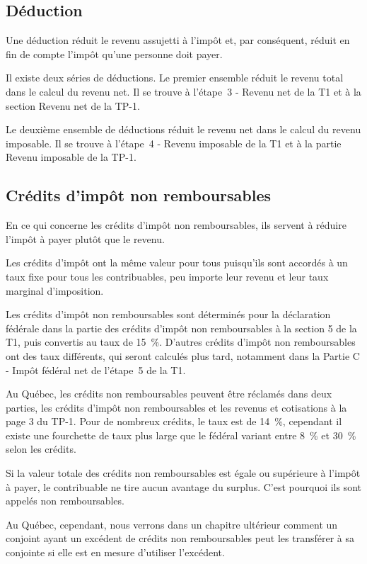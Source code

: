 \subsection{Déduction}
Une déduction réduit le revenu assujetti à l'impôt et, par conséquent, réduit en fin de compte l'impôt qu'une personne doit payer.

Il existe deux séries de déductions. Le premier ensemble réduit le revenu total dans le calcul du revenu net. Il se trouve à l'étape~3 - Revenu net de la T1 et à la section \og Revenu net \fg{} de la TP-1. 

Le deuxième ensemble de déductions réduit le revenu net dans le calcul du revenu imposable. Il se trouve à l'étape~4 - Revenu imposable de la T1 et à la partie \og Revenu imposable \fg{} de la TP-1.


\subsection{Crédits d'impôt non remboursables}
En ce qui concerne les crédits d'impôt non remboursables, ils servent à réduire l'impôt à payer plutôt que le revenu. 

Les crédits d'impôt ont la même valeur pour tous puisqu'ils sont accordés à un taux fixe pour tous les contribuables, peu importe leur revenu et leur taux marginal d'imposition. 

Les crédits d'impôt non remboursables sont déterminés pour la déclaration fédérale dans la partie des crédits d'impôt non remboursables à la section 5 de la T1, puis convertis au taux de 15~\%. D'autres crédits d'impôt non remboursables ont des taux différents, qui seront calculés plus tard, notamment dans la Partie C - Impôt fédéral net de l'étape~5 de la T1.

Au Québec, les crédits non remboursables peuvent être réclamés dans deux parties, les crédits d'impôt non remboursables et les revenus et cotisations à la page 3 du TP-1. Pour de nombreux crédits, le taux est de 14~\%, cependant il existe une fourchette de taux plus large que le fédéral variant entre 8~\% et
30~\% selon les crédits.

Si la valeur totale des crédits non remboursables est égale ou supérieure à l'impôt à payer, le contribuable ne tire aucun avantage du surplus. C'est pourquoi ils sont appelés non remboursables.

Au Québec, cependant, nous verrons dans un chapitre ultérieur comment un conjoint ayant un excédent de crédits non remboursables peut les transférer à sa conjointe si elle est en mesure d'utiliser l'excédent. 


